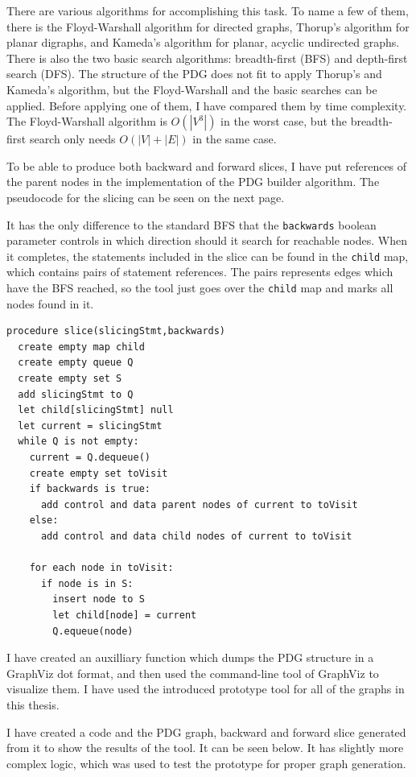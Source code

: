 \documentclass[oneside,12pt,a4paper]{book}
\begin{document}
There are various algorithms for accomplishing this task. To name a few of them, there is the Floyd-Warshall algorithm for directed graphs, Thorup's algorithm for planar digraphs, and Kameda's algorithm for planar, acyclic undirected graphs. There is also the two basic search algorithms: breadth-first (BFS) and depth-first search (DFS). The structure of the PDG does not fit to apply Thorup's and Kameda's algorithm, but the Floyd-Warshall and the basic searches can be applied. Before applying one of them, I have compared them by time complexity. The Floyd-Warshall algorithm is $O(|V^3|)$ in the worst case, but the breadth-first search only needs $O(|V| + |E|)$ in the same case.

To be able to produce both backward and forward slices, I have put references of the parent nodes in the implementation of the PDG builder algorithm. The pseudocode for the slicing can be seen on the next page. 

It has the only difference to the standard BFS that the \texttt{backwards} boolean parameter controls in which direction should it search for reachable nodes. When it completes, the statements included in the slice can be found in the \texttt{child} map, which contains pairs of statement references. The pairs represents edges which have the BFS reached, so the tool just goes over the \texttt{child} map and marks all nodes found in it. 
\clearpage
\begin{lstlisting}
procedure slice(slicingStmt,backwards)
  create empty map child
  create empty queue Q
  create empty set S
  add slicingStmt to Q
  let child[slicingStmt] null
  let current = slicingStmt
  while Q is not empty:
    current = Q.dequeue()
    create empty set toVisit
    if backwards is true:
      add control and data parent nodes of current to toVisit
    else:
      add control and data child nodes of current to toVisit
    
    for each node in toVisit: 
      if node is in S:
        insert node to S
        let child[node] = current
        Q.equeue(node)
\end{lstlisting}

I have created an auxilliary function which dumps the PDG structure in a GraphViz dot format, and then used the command-line tool of GraphViz to visualize them. I have used the introduced prototype tool for all of the graphs in this thesis.

I have created a code and the PDG graph, backward and forward slice generated from it to show the results of the tool. It can be seen below. It has slightly more complex logic, which was used to test the prototype for proper graph generation.
\end{document}
